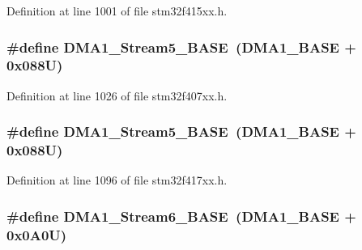 Definition at line 1001 of file stm32f415xx.\+h.

\subsubsection[{\texorpdfstring{D\+M\+A1\+\_\+\+Stream5\+\_\+\+B\+A\+SE}{DMA1_Stream5_BASE}}]{\setlength{\rightskip}{0pt plus 5cm}\#define D\+M\+A1\+\_\+\+Stream5\+\_\+\+B\+A\+SE~({\bf D\+M\+A1\+\_\+\+B\+A\+SE} + 0x088\+U)}\hypertarget{group___peripheral__registers__structures_ga0ded7bed8969fe2e2d616e7f90eb7654}{}\label{group___peripheral__registers__structures_ga0ded7bed8969fe2e2d616e7f90eb7654}


Definition at line 1026 of file stm32f407xx.\+h.

\subsubsection[{\texorpdfstring{D\+M\+A1\+\_\+\+Stream5\+\_\+\+B\+A\+SE}{DMA1_Stream5_BASE}}]{\setlength{\rightskip}{0pt plus 5cm}\#define D\+M\+A1\+\_\+\+Stream5\+\_\+\+B\+A\+SE~({\bf D\+M\+A1\+\_\+\+B\+A\+SE} + 0x088\+U)}\hypertarget{group___peripheral__registers__structures_ga0ded7bed8969fe2e2d616e7f90eb7654}{}\label{group___peripheral__registers__structures_ga0ded7bed8969fe2e2d616e7f90eb7654}


Definition at line 1096 of file stm32f417xx.\+h.

\subsubsection[{\texorpdfstring{D\+M\+A1\+\_\+\+Stream6\+\_\+\+B\+A\+SE}{DMA1_Stream6_BASE}}]{\setlength{\rightskip}{0pt plus 5cm}\#define D\+M\+A1\+\_\+\+Stream6\+\_\+\+B\+A\+SE~({\bf D\+M\+A1\+\_\+\+B\+A\+SE} + 0x0\+A0\+U)}\hypertarget{group___peripheral__registers__structures_ga58998ddc40adb6361704d6c9dad08125}{}\label{group___peripheral__registers__structures_ga58998ddc40adb6361704d6c9dad08125}


